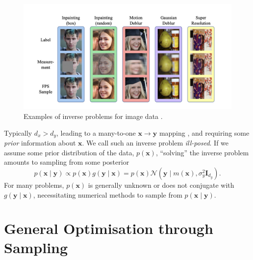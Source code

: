 \begin{figure}[htbp]
    \centering
    \includegraphics[width=1\textwidth]{assets/inverse_problems.png}
    \caption{Examples of inverse problems for image data \parencite{douDiffusionPosteriorSampling2023}.}
    \label{fig:inverse-problems}
\end{figure}

\begin{remark} \label{rem:bayes-inv}
    Typically $d_x > d_y$, leading to a many-to-one $\mathbf{x} \rightarrow \mathbf{y}$ mapping
    \parencite{chungDiffusionPosteriorSampling2022}, and requiring some \emph{prior} information
    about $\mathbf{x}$. We call such an inverse problem \emph{ill-posed}. If we assume some prior
    distribution of the data, $p(\mathbf{x})$, ``solving'' the inverse problem amounts to sampling
    from some posterior
    \begin{equation*}
        p(\mathbf{x} \mid \mathbf{y}) \propto p(\mathbf{x})g(\mathbf{y} \mid \mathbf{x})
        = p(\mathbf{x})\mathcal{N}\left(\mathbf{y} \mid m(\mathbf{x}), \sigma^2_y\mathbf{I}_{d_y}\right).
    \end{equation*}
    For many problems, $p(\mathbf{x})$ is generally unknown or does not conjugate with
    $g(\mathbf{y} \mid \mathbf{x})$, necessitating numerical methods to sample from
    $p(\mathbf{x} \mid \mathbf{y})$.
\end{remark}

\section{General Optimisation through Sampling}\label{sec:general-optimisation}

